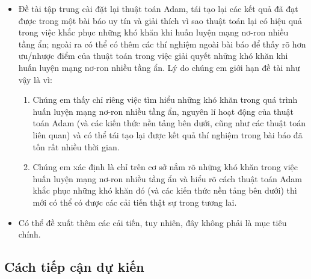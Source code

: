 \documentclass{article}[14pt]
\begin{document}
{    \begin{itemize}
        \item Đề tài tập trung cài đặt lại thuật toán Adam, tái tạo lại các kết quả đã đạt được trong một bài báo uy tín và giải thích vì sao thuật toán lại có hiệu quả trong việc khắc phục những khó khăn khi huấn luyện mạng nơ-ron nhiều tầng ẩn; ngoài ra có thể có thêm các thí nghiệm ngoài bài báo để thấy rõ hơn ưu/nhược điểm của thuật toán trong việc giải quyết những khó khăn khi huấn luyện mạng nơ-ron nhiều tầng ẩn. Lý do chúng em giới hạn đề tài như vậy là vì:
        \begin{enumerate}
            \item Chúng em thấy chỉ riêng việc tìm hiểu những khó khăn trong quá trình huấn luyện mạng nơ-ron nhiều tầng ẩn, nguyên lí hoạt động của thuật toán Adam (và các kiến thức nền tảng bên dưới, cũng như các thuật toán liên quan) và có thể tái tạo lại được kết quả thí nghiệm trong bài báo đã tốn rất nhiều thời gian.
            \item Chúng em xác định là chỉ trên cơ sở nắm rõ những khó khăn trong việc huấn luyện mạng nơ-ron nhiều tầng ẩn và hiểu rõ cách thuật toán Adam khắc phục những khó khăn đó (và các kiến thức nền tảng bên dưới) thì mới có thể có được các cải tiến thật sự trong tương lai.
        \end{enumerate}
   \item Có thể đề xuất thêm các cải tiến, tuy nhiên, đây không phải là mục tiêu chính.
    \end{itemize}
    
    \subsection{Cách tiếp cận dự kiến}
    
    
    
}
\end{document}
